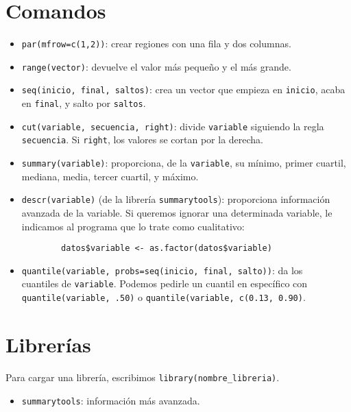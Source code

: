 \documentclass{article}
\begin{document}
\section{Comandos}
\begin{itemize}
    \item \verb|par(mfrow=c(1,2))|: crear regiones con una fila y dos columnas.
    \item \verb|range(vector)|: devuelve el valor más pequeño y el más grande.
    \item \verb|seq(inicio, final, saltos)|: crea un vector que empieza en \verb|inicio|, acaba en \verb|final|, y salto por \verb|saltos|.
    \item \verb|cut(variable, secuencia, right)|: divide \verb|variable| siguiendo la regla \verb|secuencia|. Si \verb|right|, los
    valores se cortan por la derecha.
    \item \verb|summary(variable)|: proporciona, de la \verb|variable|, su mínimo, primer cuartil, mediana, media, tercer
    cuartil, y máximo.
    \item \verb|descr(variable)| (de la librería \verb|summarytools|): proporciona información avanzada de la variable. Si
    queremos ignorar una determinada variable, le indicamos al programa que lo trate como cualitativo:
    \begin{verbatim}
        datos$variable <- as.factor(datos$variable)
    \end{verbatim}
    \item \verb|quantile(variable, probs=seq(inicio, final, salto))|: da los\\cuantiles de \verb|variable|.
    Podemos pedirle un cuantil en específico con \verb|quantile(variable, .50)| o \verb|quantile(variable, c(0.13, 0.90)|.
\end{itemize}
\section{Librerías}
Para cargar una librería, escribimos \verb|library(nombre_libreria)|.
\begin{itemize}
    \item \verb|summarytools|: información más avanzada.
\end{itemize}
\end{document}

